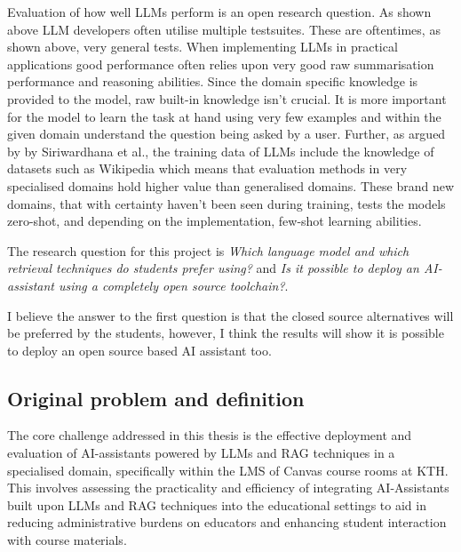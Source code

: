 Evaluation of how well LLMs perform is an open research question. As shown above LLM developers often utilise multiple testsuites. These are oftentimes, as shown above, very general tests. When implementing LLMs in practical applications good performance often relies upon very good raw summarisation performance and reasoning abilities. Since the domain specific knowledge is provided to the model, raw built-in knowledge isn’t crucial. It is more important for the model to learn the task at hand using very few examples and within the given domain understand the question being asked by a user.
Further, as argued by by Siriwardhana et al., the training data of LLMs include the knowledge of datasets such as Wikipedia \cite{siriwardhana_improving_2023} which means that evaluation methods in very specialised domains hold higher value than generalised domains. These brand new domains, that with certainty haven't been seen during training, tests the models zero-shot, and depending on the implementation, few-shot learning abilities.


The research question for this project is \textit{Which language model and which retrieval techniques do students prefer using?} and \textit{Is it possible to deploy an AI-assistant using a completely open source toolchain?}.


I believe the answer to the first question is that the closed source alternatives will be preferred by the students, however, I think the results will show it is possible to deploy an open source based AI assistant too.


\subsection{Original problem and definition}
\label{sec:researchQuestion}






The core challenge addressed in this thesis is the effective deployment and evaluation of AI-assistants powered by \gls{LLMs} and \gls{RAG} techniques in a specialised domain, specifically within the \gls{LMS} of Canvas course rooms at KTH. This involves assessing the practicality and efficiency of integrating AI-Assistants built upon LLMs and RAG techniques into the educational settings to aid in reducing administrative burdens on educators and enhancing student interaction with course materials.


